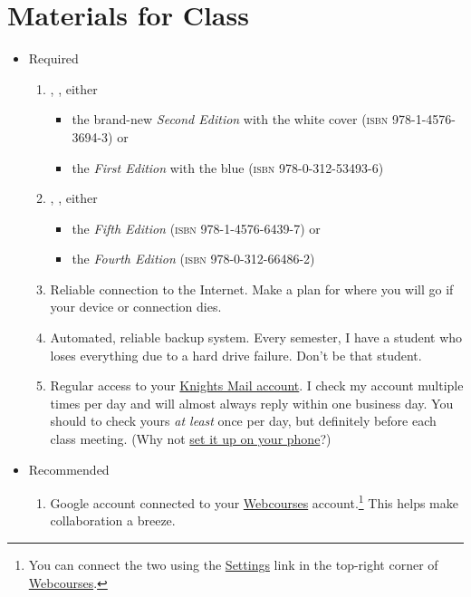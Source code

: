\documentclass[11pt, twosides]{amsart}	%
\begin{document}
\clearpage
\section{Materials for Class}
\begin{itemize}
	\item Required
		\begin{enumerate}
\item \citeauthor{downs:2010aa}, , either
\begin{itemize}
	\item the brand-new \emph{Second Edition} with the white cover (\textsc{isbn} 978-1-4576-3694-3) or
	\item the \emph{First Edition} with the blue (\textsc{isbn} 978-0-312-53493-6)
\end{itemize}
		\item \citeauthor{lunsford:2010aa}, , either
		\begin{itemize}
			\item the \emph{Fifth Edition} (\textsc{isbn} 978-1-4576-6439-7) or
			\item the \emph{Fourth Edition} (\textsc{isbn} 978-0-312-66486-2)%
		\end{itemize}%
		\item Reliable connection to the Internet. Make a plan for where you will go if your device or connection dies.
		\item Automated, reliable backup system. Every semester, I have a student who loses everything due to a hard drive failure. Don't be that student.
		\item Regular access to your \href{http://www.outlook.com/knights.ucf.edu}{Knights Mail account}. I check my account multiple times per day and will almost always reply within one business day. You should to check yours \emph{at least} once per day, but definitely before each class meeting. (Why not \href{http://www.students.graduate.ucf.edu/knights_email_for_mobile/}{set it up on your phone}?)
	\end{enumerate}
	\item Recommended
	\begin{enumerate}
		\item Google account connected to your \href{http://webcourses.instructure.com}{Webcourses} account.\footnote{You can connect the two using the \href{https://webcourses.ucf.edu/profile/settings}{Settings} link in the top-right corner of \href{http://webcourses.instructure.com}{Webcourses}.} This helps make collaboration a breeze.

\end{enumerate}
\end{itemize}
\end{document}
